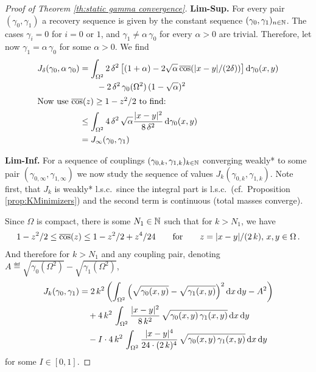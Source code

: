 \begin{proof}[Proof of Theorem \ref{th:static gamma convergence}]
\textbf{Lim-Sup.}
For every pair $(\gamma_0,\gamma_1)$ a recovery sequence is given by the constant sequence $(\gamma_0,\gamma_1)_{n\in \mathbb{N}}$. The cases $\gamma_i=0$ for $i=0$ or $1$, and $\gamma_1 \neq \alpha \, \gamma_0$ for every $\alpha>0$ are trivial. Therefore, let now $\gamma_1 = \alpha\,\gamma_0$ for some $\alpha>0$.
We find
\begin{align*}
	J_\delta(\gamma_0,\alpha\,\gamma_0) & = \int_{\Omega^2} 2\,\delta^2 \left[
		(1+\alpha) - 2 \sqrt{\alpha}\,{\overline{\cos}}(|x-y|/(2\delta)) \right] \mathrm{d}\gamma_0(x,y) \\
		& \qquad - 2\,\delta^2\,\gamma_0(\Omega^2)\,(1-\sqrt{\alpha})^2 \\
	\intertext{Now use ${\overline{\cos}}(z) \geq 1-z^2/2$ to find:}
	& \leq \int_{\Omega^2} 4\,\delta^2\,\sqrt{\alpha} \frac{|x-y|^2}{8\,\delta^2}\, \mathrm{d}\gamma_0(x,y) \\
	& = J_\infty(\gamma_0,\gamma_1)
\end{align*}

\textbf{Lim-Inf.} For a sequence of couplings $(\gamma_{0,k},\gamma_{1,k})_{k \in \mathbb{N}}$ converging weakly* to some pair $(\gamma_{0,\infty},\gamma_{1,\infty})$ we now study the sequence of values $J_k(\gamma_{0,k},\gamma_{1,k})$. Note first, that $J_k$ is weakly* l.s.c.~since the integral part is l.s.c.~(cf.~Proposition \ref{prop:KMinimizers}) and the second term is continuous (total masses converge).

Since $\Omega$ is compact, there is some $N_1 \in \mathbb{N}$ such that for $k>N_1$, we have
\begin{align*}
	1-z^2/2 \leq {\overline{\cos}}(z) \leq 1-z^2/2+z^4/24 \qquad \text{for} \qquad z=|x-y|/(2\,k),\,x,y \in \Omega\,.
\end{align*}
And therefore for $k>N_1$ and any coupling pair, denoting $A \eqdef \sqrt{\gamma_0(\Omega^2)} - \sqrt{\gamma_1(\Omega^2)}$, 
\begin{align*}
	J_k(\gamma_0,\gamma_1) & = 2\,k^2 \left(
	\int_{\Omega^2} \left( \sqrt{\gamma_0(x,y)}-\sqrt{\gamma_1(x,y)} \right)^2 \mathrm{d} x\, \mathrm{d} y
	- A^2 \right) \nonumber \\
	& \quad + 4\,k^2\,\int_{\Omega^2} \frac{|x-y|^2}{8\,k^2}\,\sqrt{\gamma_0(x,y)\,\gamma_1(x,y)}\, \mathrm{d} x\, \mathrm{d} y \\
	& \quad - I \cdot 4\,k^2\,\int_{\Omega^2} \frac{|x-y|^4}{24 \cdot (2\,k)^4} \,\sqrt{\gamma_0(x,y)\,\gamma_1(x,y)}\, \mathrm{d} x\, \mathrm{d} y
\end{align*}
for some $I \in [0,1]$.


\end{proof}
